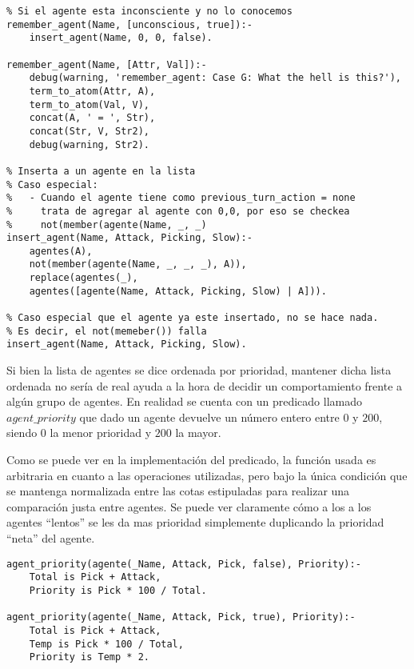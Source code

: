 \documentclass[a4paper,10pt,spanish]{article}
\begin{document}
\begin{lstlisting}
% Si el agente esta inconsciente y no lo conocemos
remember_agent(Name, [unconscious, true]):-
	insert_agent(Name, 0, 0, false).
	
remember_agent(Name, [Attr, Val]):- 
	debug(warning, 'remember_agent: Case G: What the hell is this?'),
	term_to_atom(Attr, A),
	term_to_atom(Val, V),
	concat(A, ' = ', Str),
	concat(Str, V, Str2),
	debug(warning, Str2).

% Inserta a un agente en la lista
% Caso especial: 
%	- Cuando el agente tiene como previous_turn_action = none 
%     trata de agregar al agente con 0,0, por eso se checkea 
%     not(member(agente(Name, _, _)
insert_agent(Name, Attack, Picking, Slow):- 
	agentes(A), 
	not(member(agente(Name, _, _, _), A)), 
	replace(agentes(_), 
	agentes([agente(Name, Attack, Picking, Slow) | A])).

% Caso especial que el agente ya este insertado, no se hace nada.
% Es decir, el not(memeber()) falla
insert_agent(Name, Attack, Picking, Slow).
	\end{lstlisting}
	
	Si bien la lista de agentes se dice ordenada por prioridad, mantener dicha lista ordenada no ser\'ia de real ayuda a la hora de decidir un comportamiento frente a alg\'un grupo de agentes. En realidad se cuenta con un predicado llamado $agent\_priority$ que dado un agente devuelve un n\'umero entero entre $0$ y $200$, siendo $0$ la menor prioridad y $200$ la mayor.
	
	Como se puede ver en la implementaci\'on del predicado, la funci\'on usada es arbitraria en cuanto a las operaciones utilizadas, pero bajo la \'unica condici\'on que se mantenga normalizada entre las cotas estipuladas para realizar una comparaci\'on justa entre agentes. Se puede ver claramente c\'omo a los a los agentes ``lentos'' se les da mas prioridad simplemente duplicando la prioridad ``neta'' del agente.
	
	\begin{lstlisting}
agent_priority(agente(_Name, Attack, Pick, false), Priority):-
	Total is Pick + Attack,
	Priority is Pick * 100 / Total.

agent_priority(agente(_Name, Attack, Pick, true), Priority):-
	Total is Pick + Attack,
	Temp is Pick * 100 / Total,
	Priority is Temp * 2.
	\end{lstlisting}

	
\end{document}
